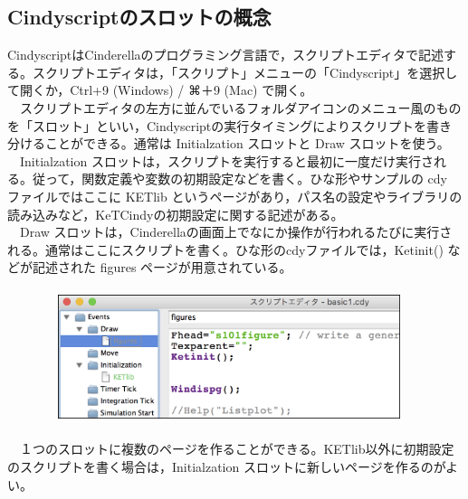 \documentclass[papersize,a4paper,12pt,uplatex]{jsarticle}
\begin{document}
\subsection{Cindyscriptのスロットの概念}
CindyscriptはCinderellaのプログラミング言語で，スクリプトエディタで記述する。スクリプトエディタは，「スクリプト」メニューの「Cindyscript」を選択して開くか，Ctrl+9 (Windows) / ⌘＋9 (Mac) で開く。\\
　スクリプトエディタの左方に並んでいるフォルダアイコンのメニュー風のものを「スロット」といい，Cindyscriptの実行タイミングによりスクリプトを書き分けることができる。通常は Initialzation スロットと Draw スロットを使う。\\
　Initialzation スロットは，スクリプトを実行すると最初に一度だけ実行される。従って，関数定義や変数の初期設定などを書く。ひな形やサンプルの cdy ファイルではここに KETlib というページがあり，パス名の設定やライブラリの読み込みなど，KeTCindyの初期設定に関する記述がある。\\
　Draw スロットは，Cinderellaの画面上でなにか操作が行われるたびに実行される。通常はここにスクリプトを書く。ひな形のcdyファイルでは，Ketinit() などが記述された figures ページが用意されている。\\
　\\
　　　　\includegraphics[bb=0 0 1076 392 , width=10cm]{Fig/slot.png}\\
　\\
　１つのスロットに複数のページを作ることができる。KETlib以外に初期設定のスクリプトを書く場合は，Initialzation スロットに新しいページを作るのがよい。\\
\end{document}
